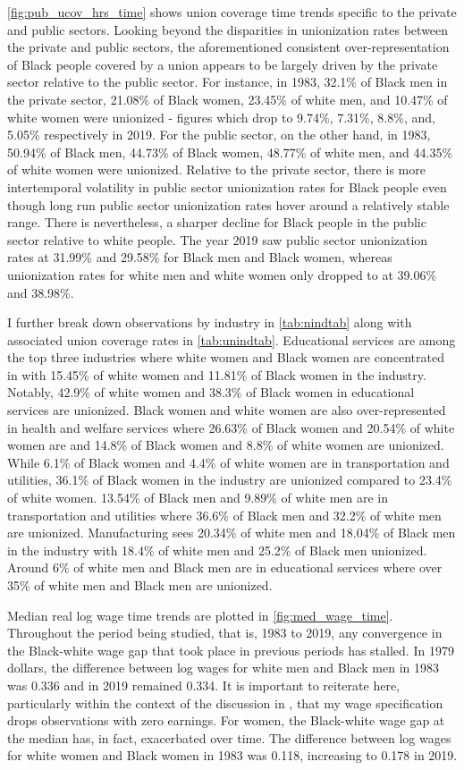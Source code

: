 \documentclass[11pt]{article}
\begin{document}
\autoref{fig:pub_ucov_hrs_time} shows union coverage time trends specific to the private and public sectors. Looking beyond the disparities in unionization rates between the private and public sectors, the aforementioned consistent over-representation of Black people covered by a union appears to be largely driven by the private sector relative to the public sector. For instance, in 1983, 32.1\% of Black men in the private sector, 21.08\% of Black women, 23.45\% of white men, and 10.47\% of white women were unionized - figures which drop to 9.74\%, 7.31\%, 8.8\%, and, 5.05\% respectively in 2019. For the public sector, on the other hand, in 1983, 50.94\% of Black men, 44.73\% of Black women, 48.77\% of white men, and 44.35\% of white women were unionized. Relative to the private sector, there is more intertemporal volatility in public sector unionization rates for Black people even though long run public sector unionization rates hover around a relatively stable range. There is nevertheless, a sharper decline for Black people in the public sector relative to white people. The year 2019 saw public sector unionization rates at 31.99\% and 29.58\% for Black men and Black women, whereas unionization rates for white men and white women only dropped to at 39.06\% and 38.98\%.

I further break down observations by industry in \autoref{tab:nindtab} along with associated union coverage rates in \autoref{tab:unindtab}. Educational services are among the top three industries where white women and Black women are concentrated in with 15.45\% of white women and 11.81\% of Black women in the industry. Notably, 42.9\% of white women and 38.3\% of Black women in educational services are unionized. Black women and white women are also over-represented in health and welfare services where 26.63\% of Black women and 20.54\% of white women are and 14.8\% of Black women and 8.8\% of white women are unionized. While 6.1\% of Black women and 4.4\% of white women are in transportation and utilities, 36.1\% of Black women in the industry are unionized compared to 23.4\% of white women. 13.54\% of Black men and 9.89\% of white men are in transportation and utilities where 36.6\% of Black men and 32.2\% of white men are unionized. Manufacturing sees 20.34\% of white men and 18.04\% of Black men in the industry with 18.4\% of white men and 25.2\% of Black men unionized. Around 6\% of white men and Black men are in educational services where over 35\% of white men and Black men are unionized. 

Median real log wage time trends are plotted in \autoref{fig:med_wage_time}. Throughout the period being studied, that is, 1983 to 2019, any convergence in the Black-white wage gap that took place in previous periods has stalled. In 1979 dollars, the difference between log wages for white men and Black men in 1983 was 0.336 and in 2019 remained 0.334. It is important to reiterate here, particularly within the context of the discussion in \citet{bayercharles2018}, that my wage specification drops observations with zero earnings. For women, the Black-white wage gap at the median has, in fact, exacerbated over time. The difference between log wages for white women and Black women in 1983 was 0.118, increasing to 0.178 in 2019. 
\end{document}
